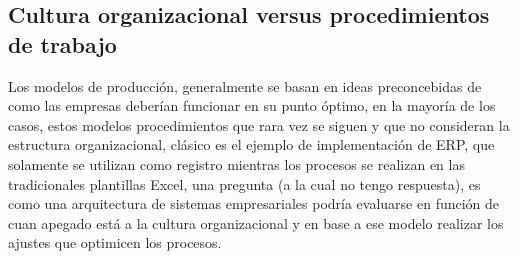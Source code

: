\documentclass{article}
\begin{document}
\subsection{Cultura organizacional versus procedimientos de trabajo}

Los modelos de producción, generalmente se basan en ideas preconcebidas de como las empresas deberían funcionar en su punto óptimo, en la mayoría de los casos, estos modelos procedimientos que rara vez se siguen y que no consideran la estructura organizacional, clásico es el ejemplo de implementación de ERP, que solamente  se utilizan como registro mientras los procesos se realizan en las tradicionales plantillas Excel, una pregunta (a la cual no tengo respuesta), es como una arquitectura de sistemas empresariales podría evaluarse en función de cuan apegado está a la cultura organizacional y en base a ese modelo realizar los ajustes que optimicen los procesos.


\nocite{*}
    
\end{document}

